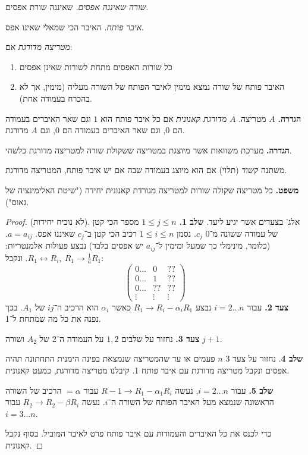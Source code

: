 \documentclass[]{article}
\newcommand\siff  {\longleftrightarrow}
\newcommand\ag    {\alpha}
\begin{document}
	\textit{שורה שאיננה אפסים. }שאיננה שורת אפסים. 
	
	\textit{איבר פותח. }האיבר הכי שמאלי שאינו אפס. 
	
	\textit{מטריצה מדורגת} אם: 
	\begin{enumerate}
		\item כל שורות האפסים מתחת לשורות שאינן אפסים
		\item האיבר פותח של שורה נמצא מימין לאיבר הפותח של השורה מעליה (מימין, אך לא בהכרח בעמודה אחת). 
	\end{enumerate}
	
	\textbf{הגדרה. }$A$ מטריצה. $A$ \textit{מדורגת קאנונית} אם כל איבר פותח הוא $1$ וגם שאר האיברים בעמודה הם $0$, וגם שאר האיברים בעמודה הם $0$, וגם $A$ מדורגת. 
	
	\textbf{הגדרה. }מערכת משוואות אשר מיוצגת במטריצה ששקולת שורה למטריצה מדורגת כלשהי. 
	
	משתנה \textit{קשור} (תלוי) אם הוא מיוצג בעמודה שבה אם יש איבר פותח, המטריצה מדורגת. 
	
	\textbf{משפט. }כל מטריצה שקולה שורות למטריצה מגורדת קאנונית יחידה ("שיטת האלימינציה של גאוס"). 
	\begin{proof}
		(לא נוכיח יחידות). אלג' בצעדים אשר יגיע ליעד. 
		\textbf{שלב 1. }$1 \le j \le n$ מספר הכי קטן של עמודה ששונה מ־$0$ $c_j$. נסמן $1 \le i \le n$ רכיב הכי קטן ב־$c_j$ שאיננו אפס. $a = a_{ij}$. (כלומר, מינימלי כך שמעל ומימין ל־$a_{ij}$ יש אפסים בלבד)
		נבצע פעולות אלמנטריות: $R_1 \siff R_i, \ R_1 \to \frac{1}{a}R_1$. ונקבל: 
		\[ \begin{pmatrix}
			0... & 0 & ?? \\
			0... & 1 & ??\\
			0... & ?? & ?? \\
			\vdots & \vdots & \vdots
		\end{pmatrix} \]
		\textbf{צעד 2. }עבור $i = 2\dots n$ נבצע $R_1 \to R_i - \ag_iR_1$ כאשר $\ag_i$ הוא הרכיב ה־$ij$ של $A_1$. בכך נפנה את כל מה שמתחת ל־1. 
		
		\textbf{צעד 3. }נחזור על שלבים $1, 2$ על העמודה ה־$2$ של $A_2$ ושורה $j + 1$. 
		
		\textbf{שלב 4}. נחזור על צעד 3 $n$ פעמים או עד שהמטריצה שנמצאת בפינה הימנית התחתונה תהיה אפסים ונקבל מטריצה מדורגת עם איבר פותח 1. 
		קיבלנו מטריצה מדורגת, כמעט קאנונית. 
		
		\textbf{שלב 5. }עבור $i = 2 \dots n$, נעשה $R-1 \to R_1 - \ag_1R_i$ עבור $=\alpha$ הרכיב של השורה הראשונה שנמצא מעל האיבר הפותח של השורה ה־$i$. נעשה $R_2 \to R_2 - \beta R_i$ עבור $i = 3 \dots n$. 
		
		כדי לכנס את כל האיברים והעמודות עם איבר פותח פרט לאיבר המוביל. בסוף נקבל קאנונית. 
	\end{proof}
\end{document}
